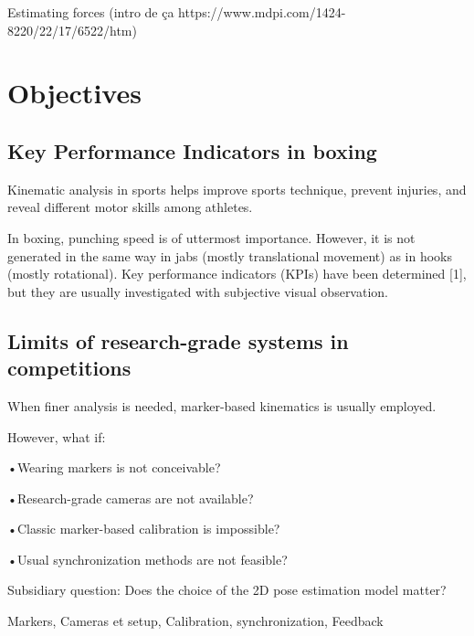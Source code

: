 \clearpage

\minitoc
\newpage





Estimating forces (intro de ça https://www.mdpi.com/1424-8220/22/17/6522/htm)

\section{Objectives}

\subsection{Key Performance Indicators in boxing}

Kinematic analysis in sports helps improve sports technique, prevent injuries, and reveal different motor skills among athletes.

In boxing, punching speed is of uttermost importance. However, it is not generated in the same way in jabs (mostly translational movement) as in hooks (mostly rotational). Key performance indicators (KPIs) have been determined [1], but they are usually investigated with subjective visual observation. 


\subsection{Limits of research-grade systems in competitions}

When finer analysis is needed, marker-based kinematics is usually employed. 

However, what if:

•Wearing markers is not conceivable? 

•Research-grade cameras are not available?

•Classic marker-based calibration is impossible? 

•Usual synchronization methods are not feasible? 

Subsidiary question: Does the choice of the 2D pose estimation model matter?



Markers, Cameras et setup, Calibration, synchronization, Feedback




